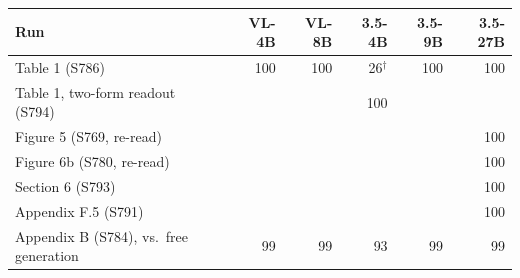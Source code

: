 \begin{tabular}{@{}lrrrrr@{}}
\toprule
Run & VL-4B & VL-8B & 3.5-4B & 3.5-9B & 3.5-27B \\
\midrule
Table 1 (S786) & 100 & 100 & 26$^\dagger$ & 100 & 100 \\
Table 1, two-form readout (S794) &  &  & 100 &  &  \\
Figure 5 (S769, re-read) &  &  &  &  & 100 \\
Figure 6b (S780, re-read) &  &  &  &  & 100 \\
Section 6 (S793) &  &  &  &  & 100 \\
Appendix F.5 (S791) &  &  &  &  & 100 \\
Appendix B (S784), vs.\ free generation & 99 & 99 & 93 & 99 & 99 \\
\bottomrule
\end{tabular}
